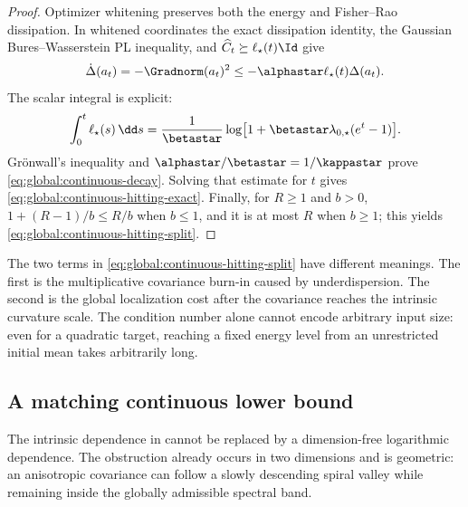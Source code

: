 \begin{proof}
Optimizer whitening preserves both the energy and Fisher--Rao dissipation.  In whitened
coordinates the exact dissipation identity, the Gaussian Bures--Wasserstein PL inequality, and
\(\widehat C_t\succeq\ell_\star(t)\Id\) give
\begin{equation}
\label{eq:global:continuous-differential-inequality}
    \dot\Delta(a_t)
    =-\Gradnorm(a_t)^2
    \leq-\alphastar\ell_\star(t)\Delta(a_t).
\end{equation}
The scalar integral is explicit:
\begin{equation}
\label{eq:global:continuous-floor-integral}
    \int_0^t\ell_\star(s)\,\dd s
    =\frac1{\betastar}
      \log\bigl[1+\betastar\lambda_{0,\star}(e^t-1)\bigr].
\end{equation}
Gr\"onwall's inequality and \(\alphastar/\betastar=1/\kappastar\) prove
\eqref{eq:global:continuous-decay}.  Solving that estimate for \(t\) gives
\eqref{eq:global:continuous-hitting-exact}.  Finally, for \(R\geq1\) and \(b>0\),
\(
1+(R-1)/b\leq R/b
\) when \(b\leq1\), and it is at most \(R\) when \(b\geq1\); this yields
\eqref{eq:global:continuous-hitting-split}.
\end{proof}

The two terms in \eqref{eq:global:continuous-hitting-split} have different meanings.  The first is
the multiplicative covariance burn-in caused by underdispersion.  The second is the global
localization cost after the covariance reaches the intrinsic curvature scale.  The condition
number alone cannot encode arbitrary input size: even for a quadratic target, reaching a fixed
energy level from an unrestricted initial mean takes arbitrarily long.

\subsection{A matching continuous lower bound}
\label{sec:global:continuous-sharpness}

The intrinsic dependence in  cannot be replaced by a
dimension-free logarithmic dependence.  The obstruction already occurs in two dimensions and is
geometric: an anisotropic covariance can follow a slowly descending spiral valley while remaining
inside the globally admissible spectral band.

